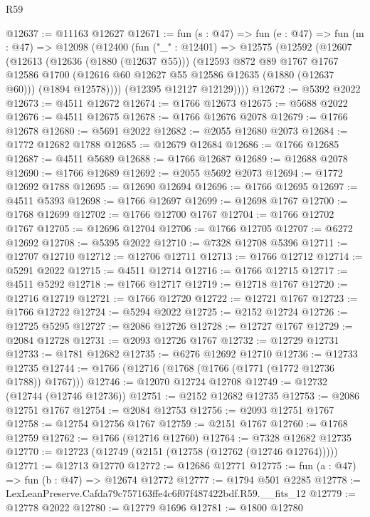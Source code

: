 \begin{lexlean}{R59}
\begin{coremodule}
@12637 := @11163 @12627
@12671 := fun (s : @47) =>
  fun (e : @47) =>
  fun (m : @47) =>
  @12098
    (@12400
      (fun ("_" : @12401) =>
      @12575
        (@12592
          (@12607
            (@12613
              (@12636 (@1880 (@12637 @55)))
              (@12593
                @872
                @89
                @1767
                @1767
                @12586
                @1700
                (@12616 @60 @12627 @55 @12586 @12635 (@1880 (@12637 @60)))
                (@1894 @12578))))
          (@12395 @12127 @12129))))
@12672 := @5392 @2022
@12673 := @4511 @12672
@12674 := @1766 @12673
@12675 := @5688 @2022
@12676 := @4511 @12675
@12678 := @1766 @12676 @2078
@12679 := @1766 @12678
@12680 := @5691 @2022
@12682 := @2055 @12680 @2073
@12684 := @1772 @12682 @1788
@12685 := @12679 @12684
@12686 := @1766 @12685
@12687 := @4511 @5689
@12688 := @1766 @12687
@12689 := @12688 @2078
@12690 := @1766 @12689
@12692 := @2055 @5692 @2073
@12694 := @1772 @12692 @1788
@12695 := @12690 @12694
@12696 := @1766 @12695
@12697 := @4511 @5393
@12698 := @1766 @12697
@12699 := @12698 @1767
@12700 := @1768 @12699
@12702 := @1766 @12700 @1767
@12704 := @1766 @12702 @1767
@12705 := @12696 @12704
@12706 := @1766 @12705
@12707 := @6272 @12692
@12708 := @5395 @2022
@12710 := @7328 @12708 @5396
@12711 := @12707 @12710
@12712 := @12706 @12711
@12713 := @1766 @12712
@12714 := @5291 @2022
@12715 := @4511 @12714
@12716 := @1766 @12715
@12717 := @4511 @5292
@12718 := @1766 @12717
@12719 := @12718 @1767
@12720 := @12716 @12719
@12721 := @1766 @12720
@12722 := @12721 @1767
@12723 := @1766 @12722
@12724 := @5294 @2022
@12725 := @2152 @12724
@12726 := @12725 @5295
@12727 := @2086 @12726
@12728 := @12727 @1767
@12729 := @2084 @12728
@12731 := @2093 @12726 @1767
@12732 := @12729 @12731
@12733 := @1781 @12682
@12735 := @6276 @12692 @12710
@12736 := @12733 @12735
@12744 := @1766 (@12716 (@1768 (@1766 (@1771 (@1772 @12736 @1788)) @1767)))
@12746 := @12070 @12724 @12708
@12749 := @12732 (@12744 (@12746 @12736))
@12751 := @2152 @12682 @12735
@12753 := @2086 @12751 @1767
@12754 := @2084 @12753
@12756 := @2093 @12751 @1767
@12758 := @12754 @12756 @1767
@12759 := @2151 @1767
@12760 := @1768 @12759
@12762 := @1766 (@12716 @12760)
@12764 := @7328 @12682 @12735
@12770 := @12723 (@12749 (@2151 (@12758 (@12762 (@12746 @12764)))))
@12771 := @12713 @12770
@12772 := @12686 @12771
@12775 := fun (a : @47) => fun (b : @47) => @12674 @12772
@12777 := @1794 @501 @2285
@12778 := LexLeanPreserve.Cafda79c757163ffe4c6f07f487422bdf.R59.__fits_12
@12779 := @12778 @2022
@12780 := @12779 @1696
@12781 := @1800 @12780

\end{coremodule}
\end{lexlean}
